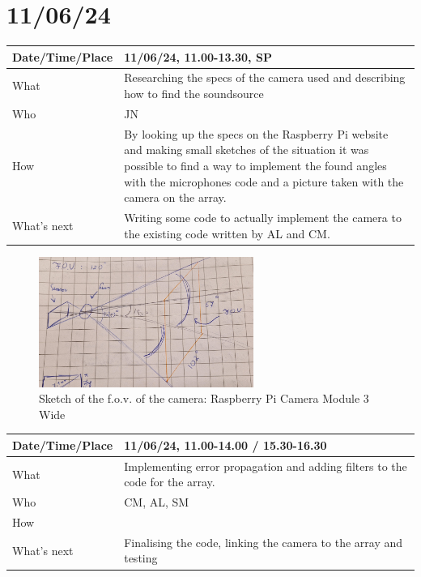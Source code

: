 \documentclass{article}
\begin{document}
\section{11/06/24}

\begin{table}[H]
\begin{tabular}{|p{1.5in}|p{4in}|}
\hline
Date/Time/Place &  11/06/24, 11.00-13.30, SP\\ \hline
What            &  Researching the specs of the camera used and describing how to find the soundsource\\ \hline
Who             &  JN\\ \hline
How             &  By looking up the specs on the Raspberry Pi website and making small sketches of the situation it was possible to find a way to implement the found angles with the microphones code and a picture taken with the camera on the array. \\ \hline
What's next     &  Writing some code to actually implement the camera to the existing code written by AL and CM.\\ \hline
\end{tabular}
\end{table}

\begin{figure}[H]
    \centering
    \includegraphics[width=7cm]{Foto tekening sensor en F.O.V..jpg}
    \caption{Sketch of the f.o.v. of the camera: Raspberry Pi Camera Module 3 Wide}   
\end{figure}


\begin{table}[H]
\begin{tabular}{|p{1.5in}|p{4in}|}
\hline
Date/Time/Place & 11/06/24, 11.00-14.00 / 15.30-16.30 \\ \hline
What            & Implementing error propagation and adding filters to the code for the array. \\ \hline
Who             & CM, AL, SM \\ \hline
How             &  \\ \hline
What's next     & Finalising the code, linking the camera to the array and testing \\ \hline
\end{tabular}
\end{table}
\end{document}

